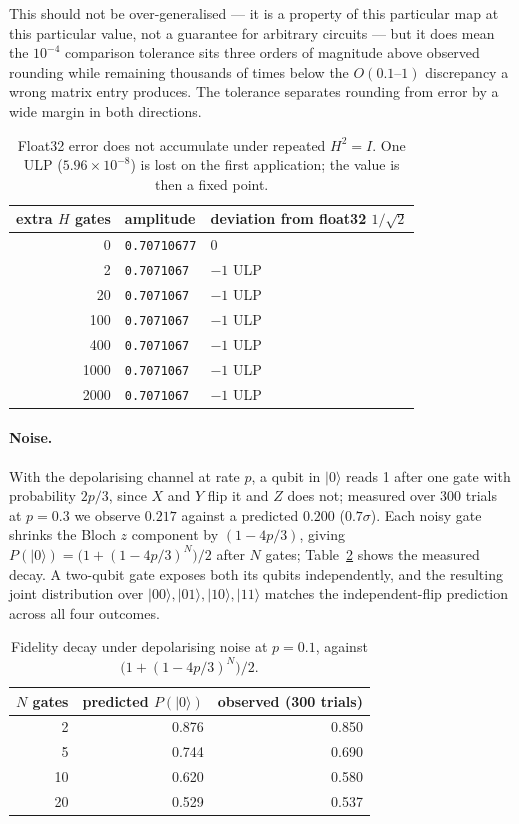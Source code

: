 \documentclass[11pt]{article}
\newcommand{\ket}[1]{\ensuremath{|#1\rangle}}
\begin{document}
This should not be over-generalised --- it is a property of this particular map at this
particular value, not a guarantee for arbitrary circuits --- but it does mean the $10^{-4}$
comparison tolerance sits three orders of magnitude above observed rounding while remaining
thousands of times below the $O(0.1\text{--}1)$ discrepancy a wrong matrix entry produces.
The tolerance separates rounding from error by a wide margin in both directions.

\begin{table}[t]
\centering
\begin{tabular}{rll}
\toprule
extra $H$ gates & amplitude & deviation from float32 $1/\sqrt2$ \\
\midrule
0    & \texttt{0.70710677} & $0$ \\
2    & \texttt{0.7071067}  & $-1$ ULP \\
20   & \texttt{0.7071067}  & $-1$ ULP \\
100  & \texttt{0.7071067}  & $-1$ ULP \\
400  & \texttt{0.7071067}  & $-1$ ULP \\
1000 & \texttt{0.7071067}  & $-1$ ULP \\
2000 & \texttt{0.7071067}  & $-1$ ULP \\
\bottomrule
\end{tabular}
\caption{Float32 error does not accumulate under repeated $H^2 = I$. One ULP
($5.96\times10^{-8}$) is lost on the first application; the value is then a fixed point.}
\label{tab:drift}
\end{table}

\paragraph{Noise.} With the depolarising channel at rate $p$, a qubit in \ket{0} reads 1
after one gate with probability $2p/3$, since $X$ and $Y$ flip it and $Z$ does not; measured
over 300 trials at $p = 0.3$ we observe $0.217$ against a predicted $0.200$ ($0.7\sigma$).
Each noisy gate shrinks the Bloch $z$ component by $(1 - 4p/3)$, giving
$P(\ket{0}) = \bigl(1 + (1-4p/3)^N\bigr)/2$ after $N$ gates; Table~\ref{tab:decay} shows
the measured decay. A two-qubit gate exposes both its qubits independently, and the
resulting joint distribution over $\ket{00}, \ket{01}, \ket{10}, \ket{11}$ matches the
independent-flip prediction across all four outcomes.

\begin{table}[t]
\centering
\begin{tabular}{rrr}
\toprule
$N$ gates & predicted $P(\ket{0})$ & observed (300 trials) \\
\midrule
2  & 0.876 & 0.850 \\
5  & 0.744 & 0.690 \\
10 & 0.620 & 0.580 \\
20 & 0.529 & 0.537 \\
\bottomrule
\end{tabular}
\caption{Fidelity decay under depolarising noise at $p = 0.1$, against
$\bigl(1+(1-4p/3)^N\bigr)/2$.}
\label{tab:decay}
\end{table}
\end{document}
